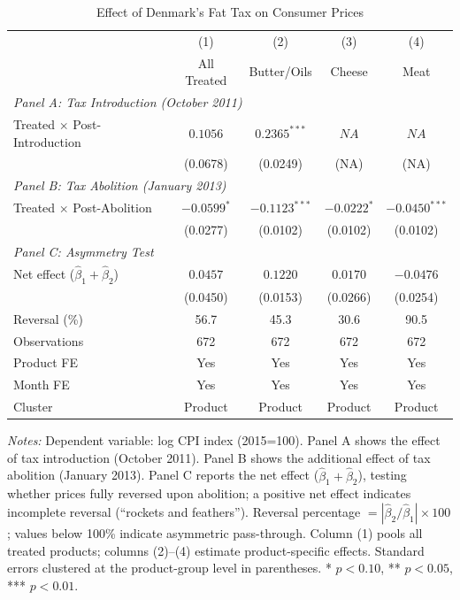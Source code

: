 \begin{table}[H]
\centering
\caption{Effect of Denmark's Fat Tax on Consumer Prices}
\label{tab:main}
\begin{threeparttable}
\begin{tabular}{lcccc}
\toprule
 & (1) & (2) & (3) & (4) \\
 & All Treated & Butter/Oils & Cheese & Meat \\
\midrule
\multicolumn{5}{l}{\textit{Panel A: Tax Introduction (October 2011)}} \\
Treated $\times$ Post-Introduction & $0.1056$ & $0.2365^{***}$ & $NA$ & $NA$ \\
 & (0.0678) & (0.0249) & (NA) & (NA) \\
[0.5em]
\multicolumn{5}{l}{\textit{Panel B: Tax Abolition (January 2013)}} \\
Treated $\times$ Post-Abolition & $-0.0599^{*}$ & $-0.1123^{***}$ & $-0.0222^{*}$ & $-0.0450^{***}$ \\
 & (0.0277) & (0.0102) & (0.0102) & (0.0102) \\
[0.5em]
\multicolumn{5}{l}{\textit{Panel C: Asymmetry Test}} \\
Net effect ($\hat{\beta}_1 + \hat{\beta}_2$) & $0.0457$ & $0.1220$ & $0.0170$ & $-0.0476$ \\
 & (0.0450) & (0.0153) & (0.0266) & (0.0254) \\
Reversal (\%) & 56.7 & 45.3 & 30.6 & 90.5 \\
\midrule
Observations & 672 & 672 & 672 & 672 \\
Product FE & Yes & Yes & Yes & Yes \\
Month FE & Yes & Yes & Yes & Yes \\
Cluster & Product & Product & Product & Product \\
\bottomrule
\end{tabular}
\begin{tablenotes}[flushleft]
\small
\item \textit{Notes:} Dependent variable: log CPI index (2015=100). Panel A shows the effect of tax introduction (October 2011). Panel B shows the additional effect of tax abolition (January 2013). Panel C reports the net effect ($\hat{\beta}_1 + \hat{\beta}_2$), testing whether prices fully reversed upon abolition; a positive net effect indicates incomplete reversal (``rockets and feathers''). Reversal percentage $= |\hat{\beta}_2 / \hat{\beta}_1| \times 100$; values below 100\% indicate asymmetric pass-through. Column (1) pools all treated products; columns (2)--(4) estimate product-specific effects. Standard errors clustered at the product-group level in parentheses. * $p<0.10$, ** $p<0.05$, *** $p<0.01$.
\end{tablenotes}
\end{threeparttable}
\end{table}

